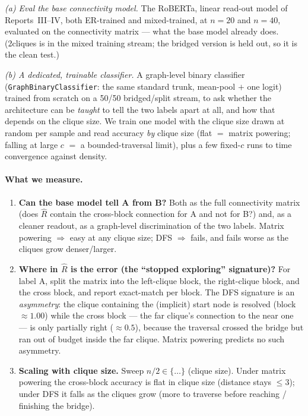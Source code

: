 \documentclass[11pt,a4paper]{article}
\begin{document}
\emph{(a) Eval the base connectivity model.} The RoBERTa, linear read-out model of
Reports~III--IV, both ER-trained and mixed-trained, at $n=20$ and $n=40$, evaluated on the
connectivity matrix --- what the base model already does. (2cliques is in the mixed training
stream; the bridged version is held out, so it is the clean test.)

\emph{(b) A dedicated, trainable classifier.} A graph-level binary classifier
(\texttt{GraphBinaryClassifier}: the same standard trunk, mean-pool $+$ one logit) trained from
scratch on a 50/50 bridged/split stream, to ask whether the architecture can be \emph{taught}
to tell the two labels apart at all, and how that depends on the clique size. We train one model
with the clique size drawn at random per sample and read accuracy \emph{by} clique size (flat
$=$ matrix powering; falling at large $c$ $=$ a bounded-traversal limit), plus a few fixed-$c$
runs to time convergence against density.

\paragraph{What we measure.}
\begin{enumerate}\setlength\itemsep{0.1em}
  \item \textbf{Can the base model tell A from B?} Both as the full connectivity matrix
        (does $\hat R$ contain the cross-block connection for A and not for B?) and, as a
        cleaner readout, as a graph-level discrimination of the two labels. Matrix powering
        $\Rightarrow$ easy at any clique size; DFS $\Rightarrow$ fails, and fails worse as the
        cliques grow denser/larger.
  \item \textbf{Where in $\hat R$ is the error (the ``stopped exploring'' signature)?} For
        label A, split the matrix into the left-clique block, the right-clique block, and the
        cross block, and report exact-match per block. The DFS signature is an \emph{asymmetry}:
        the clique containing the (implicit) start node is resolved (block $\approx 1.00$) while
        the cross block --- the far clique's connection to the near one --- is only partially
        right ($\approx 0.5$), because the traversal crossed the bridge but ran out of budget
        inside the far clique. Matrix powering predicts no such asymmetry.
  \item \textbf{Scaling with clique size.} Sweep $n/2 \in \{\dots\}$ (clique size). Under matrix
        powering the cross-block accuracy is flat in clique size (distance stays $\le 3$); under
        DFS it falls as the cliques grow (more to traverse before reaching / finishing the
        bridge).
\end{enumerate}
\end{document}
